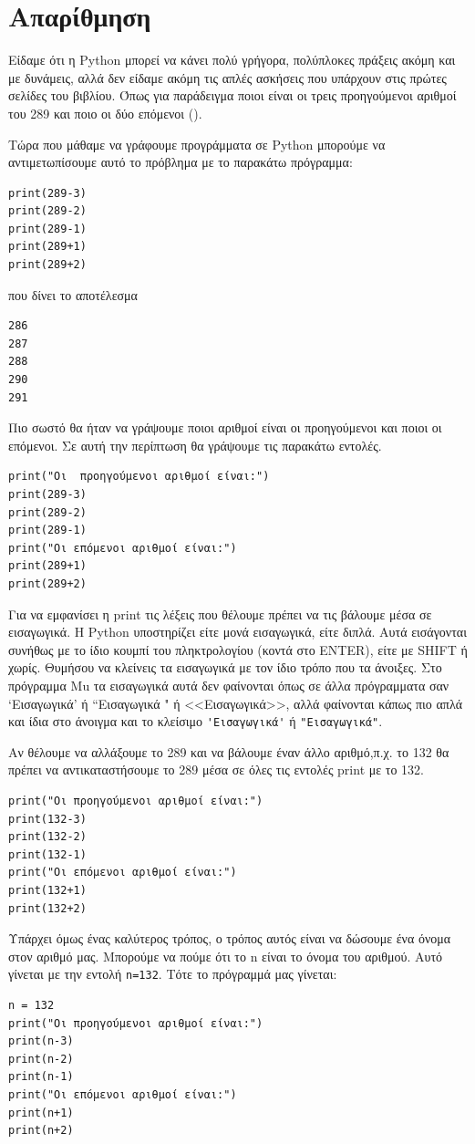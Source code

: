 \section{Απαρίθμηση}
Είδαμε ότι η Python μπορεί να κάνει πολύ γρήγορα, πολύπλοκες πράξεις ακόμη και με δυνάμεις, αλλά δεν είδαμε ακόμη τις απλές ασκήσεις που υπάρχουν στις πρώτες σελίδες του βιβλίου. Όπως για παράδειγμα ποιοι είναι οι τρεις προηγούμενοι αριθμοί του 289 και ποιο οι δύο επόμενοι ().

Τώρα που μάθαμε να γράφουμε προγράμματα σε Python μπορούμε να αντιμετωπίσουμε αυτό το πρόβλημα με το παρακάτω πρόγραμμα:
\begin{lstlisting}
print(289-3)
print(289-2)
print(289-1)
print(289+1)
print(289+2)
\end{lstlisting}
που δίνει το αποτέλεσμα
\begin{lstlisting}
286
287
288
290
291
\end{lstlisting}

Πιο σωστό θα ήταν να γράψουμε ποιοι αριθμοί είναι οι προηγούμενοι και ποιοι οι επόμενοι. Σε αυτή την περίπτωση θα γράψουμε τις παρακάτω εντολές.
\begin{lstlisting}
print("Οι  προηγούμενοι αριθμοί είναι:")
print(289-3)
print(289-2)
print(289-1)
print("Οι επόμενοι αριθμοί είναι:")
print(289+1)
print(289+2)
\end{lstlisting}

Για να εμφανίσει η print τις λέξεις που θέλουμε πρέπει να τις βάλουμε μέσα σε εισαγωγικά. Η Python υποστηρίζει είτε μονά εισαγωγικά, είτε διπλά. Αυτά εισάγονται συνήθως με το ίδιο κουμπί του πληκτρολογίου (κοντά στο ENTER), είτε με SHIFT ή χωρίς. Θυμήσου να κλείνεις τα εισαγωγικά με τον ίδιο τρόπο που τα άνοιξες. Στο πρόγραμμα Mu τα εισαγωγικά αυτά δεν φαίνονται όπως σε άλλα πρόγραμματα σαν `Εισαγωγικά' ή ``Εισαγωγικά " ή <<Εισαγωγικά>>, αλλά φαίνονται κάπως πιο απλά και ίδια στο άνοιγμα και το κλείσιμο \lstinline{'Εισαγωγικά'} ή  \lstinline{"Εισαγωγικά"}. 

Αν θέλουμε να αλλάξουμε το 289 και να βάλουμε έναν άλλο αριθμό,π.χ. το 132 θα πρέπει να αντικαταστήσουμε το 289 μέσα σε όλες τις εντολές print με το 132.
\begin{lstlisting}
print("Οι προηγούμενοι αριθμοί είναι:")
print(132-3)
print(132-2)
print(132-1)
print("Οι επόμενοι αριθμοί είναι:")
print(132+1)
print(132+2)
\end{lstlisting}

Υπάρχει όμως ένας καλύτερος τρόπος, ο τρόπος αυτός είναι να δώσουμε ένα όνομα στον αριθμό μας. Μπορούμε να πούμε ότι το n είναι το όνομα του αριθμού. Αυτό γίνεται με την εντολή \lstinline{n=132}. Τότε το πρόγραμμά μας γίνεται:
\begin{lstlisting}
n = 132
print("Οι προηγούμενοι αριθμοί είναι:")
print(n-3)
print(n-2)
print(n-1)
print("Οι επόμενοι αριθμοί είναι:")
print(n+1)
print(n+2)
\end{lstlisting}

